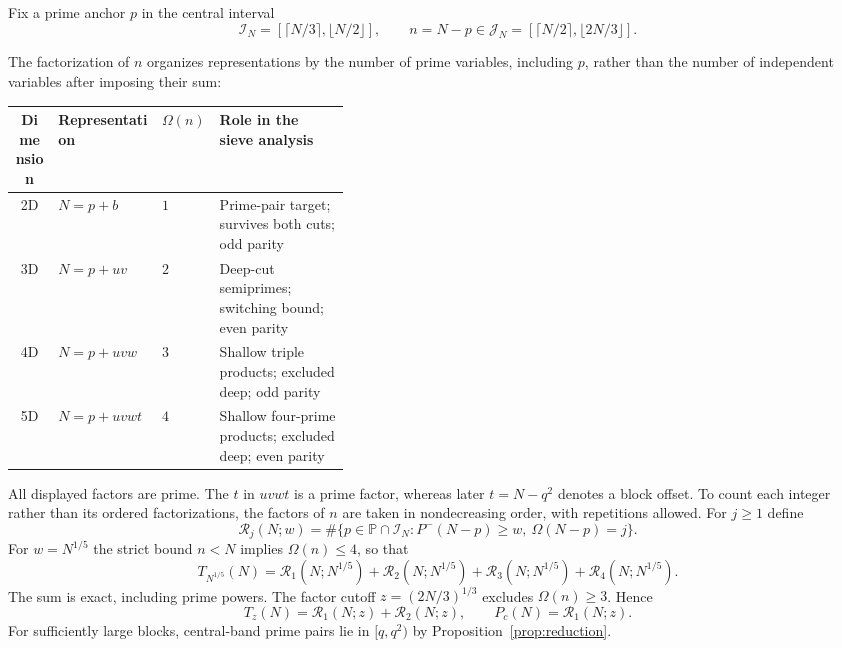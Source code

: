 \documentclass[final,11pt]{elsarticle}
\theoremstyle{definition}
\theoremstyle{remark}
\numberwithin{equation}{section}
\begin{document}
Fix a prime anchor $p$ in the central interval
\begin{equation}\label{eq:intro-bands}
 \mathcal I_N=[\lceil N/3\rceil,\lfloor N/2\rfloor],\qquad
 n=N-p\in\mathcal J_N=[\lceil N/2\rceil,\lfloor 2N/3\rfloor].
\end{equation}
\begin{samepage}
The factorization of $n$ organizes representations by the number of prime variables, including $p$, rather than the number of independent variables after imposing their sum:
\begin{center}
\small
\renewcommand{\arraystretch}{1.19}
\begin{tabular}{@{}c l l p{0.39\linewidth}@{}}
\toprule
Dimension & Representation & $\Omega(n)$ & Role in the sieve analysis\\
\midrule
2D & $N=p+b$ & $1$ & Prime-pair target; survives both cuts; odd parity\\
3D & $N=p+uv$ & $2$ & Deep-cut semiprimes; switching bound; even parity\\
4D & $N=p+uvw$ & $3$ & Shallow triple products; excluded deep; odd parity\\
5D & $N=p+uvwt$ & $4$ & Shallow four-prime products; excluded deep; even parity\\
\bottomrule
\end{tabular}
\end{center}
\end{samepage}
All displayed factors are prime. The $t$ in $uvwt$ is a prime factor, whereas later $t=N-q^2$ denotes a block offset. To count each integer rather than its ordered factorizations, the factors of $n$ are taken in nondecreasing order, with repetitions allowed. For $j\ge1$ define
\[
 \mathcal R_j(N;w)=\#\{p\in\mathbb P\cap\mathcal I_N:
 P^-(N-p)\ge w,\ \Omega(N-p)=j\}.
\]
For $w=N^{1/5}$ the strict bound $n<N$ implies $\Omega(n)\le4$, so that
\begin{equation}\label{eq:dimensional-decomp}
 T_{N^{1/5}}(N)=\mathcal R_1(N;N^{1/5})+\mathcal R_2(N;N^{1/5})
 +\mathcal R_3(N;N^{1/5})+\mathcal R_4(N;N^{1/5}).
\end{equation}
The sum is exact, including prime powers. The factor cutoff $z=(2N/3)^{1/3}$ excludes $\Omega(n)\ge3$. Hence
\begin{equation}\label{eq:deep-dimensional-decomp}
 T_z(N)=\mathcal R_1(N;z)+\mathcal R_2(N;z),\qquad
 P_c(N)=\mathcal R_1(N;z).
\end{equation}
For sufficiently large blocks, central-band prime pairs lie in $[q,q^2)$ by Proposition~\ref{prop:reduction}.
\end{document}
